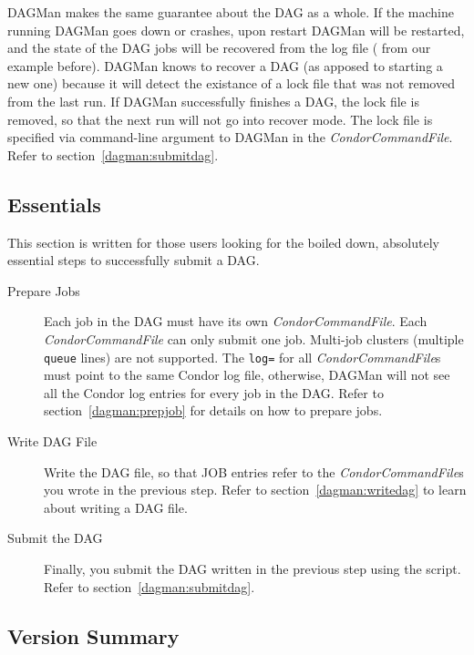 DAGMan makes the same guarantee about the DAG as a whole.  If the machine
running DAGMan goes down or crashes, upon restart DAGMan will be restarted,
and the state of the DAG jobs will be recovered from the log file
( from our example before).  DAGMan knows to
recover a DAG (as apposed to starting a new one) because it will detect the
existance of a lock file that was not removed from the last run.  If DAGMan
successfully finishes a DAG, the lock file is removed, so that the next run
will not go into recover mode.  The lock file is specified via command-line
argument to DAGMan in the \textit{CondorCommandFile}.  Refer to
section~\ref{dagman:submitdag}.

\subsection{Essentials}
\label{dagman:essentials}

This section is written for those users looking for the boiled down,
absolutely essential steps to successfully submit a DAG.

\begin{description}

\item[Prepare Jobs] Each job in the DAG must have its own
\textit{CondorCommandFile}.  Each \textit{CondorCommandFile} can only submit
one job.  Multi-job clusters (multiple \texttt{queue} lines) are not
supported.  The \texttt{log=} for all \textit{CondorCommandFile}s must point
to the same Condor log file, otherwise, DAGMan will not see all the Condor log
entries for every job in the DAG.  Refer to section~\ref{dagman:prepjob} for
details on how to prepare jobs.

\item[Write DAG File] Write the DAG file, so that JOB entries refer to the
\textit{CondorCommandFile}s you wrote in the previous step.  Refer to
section~\ref{dagman:writedag} to learn about writing a DAG file.

\item[Submit the DAG] Finally, you submit the DAG written in the previous step
using the  script.  Refer to
section~\ref{dagman:submitdag}.

\end{description}


\subsection{Version Summary}
\label{dagman:version}

